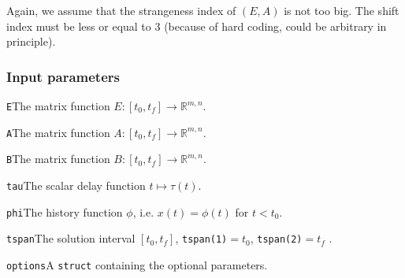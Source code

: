 \documentclass[final,reqno]{siamltex}
\renewenvironment{itemize}[1]{\begin{compactitem}#1}{\end{compactitem}}
\begin{document}
Again, we assume that the strangeness index of $(E,A)$ is not too big. The shift index must be less or equal to 3 (because of hard coding, could be arbitrary in principle).

\subsubsection{Input parameters}
\begin{itemize}
\item {\tt E}\quad The matrix function $E:[t_0,t_f]\rightarrow \mathbb{R}^{m,n}$.
\item {\tt A}\quad The matrix function $A:[t_0,t_f]\rightarrow \mathbb{R}^{m,n}$.
\item {\tt B}\quad The matrix function $B:[t_0,t_f]\rightarrow \mathbb{R}^{m,n}$.
\item {\tt tau}\quad  The scalar delay function $t\mapsto \tau(t)$.
\item {\tt phi}\quad The history function $\phi$, i.e. $x(t)=\phi(t)$ for $t < t_0$.
\item {\tt tspan}\quad The solution interval $[t_0,t_f]$, {\tt tspan(1)}$ = t_0$, {\tt tspan(2)}$ = t_f$ .
\item {\tt options}\quad A {\tt struct} containing the optional parameters.
\end{itemize}
\end{document}
